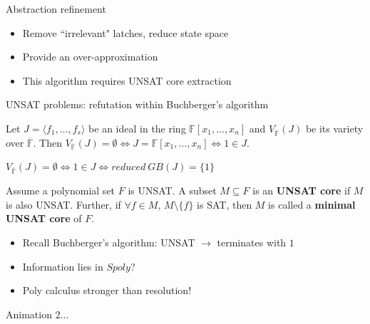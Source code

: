 \documentclass[xcolor=dvipsnames]{beamer}
\newcommand{\bi}{\begin{itemize}}
\newcommand{\ei}{\end{itemize}}
\newcommand{\F}{{\mathbb{F}}}
\begin{document}
\begin{frame}[label = refine]{\large{Abstraction refinement}}
\begin{figure}[hbt]
\end{figure}
\vspace{-0.2in}
\bi
\item Remove ``irrelevant" latches, reduce state space
\item Provide an over-approximation
\item This algorithm requires \alert{UNSAT core extraction}
\ei
\hyperlink{motiv3}{}
\end{frame}
\begin{frame}[label = UNSAT]{\large{UNSAT problems: refutation within Buchberger's algorithm}}
\begin{Theorem}
Let $J = \langle f_1,\dots, f_s \rangle $ be
an ideal in the ring $ \mathbb{F}[x_1, \dots, x_n]$ and $V_{\overline{\F}}(J)$ be its
variety over $\overline{\F}$. Then $V_{\overline{\F}}(J) = \emptyset \iff J =
\mathbb{F}[x_1,\dots,x_n] \iff 1 \in J$.  
\end{Theorem}
$V_{\overline{\F}}(J)=\emptyset \iff 1\in J \iff reduced~GB(J) = \{1\}$
\begin{Definition}
Assume a polynomial set $F$ is UNSAT. A subset $M \subseteq F$ is an {\bf UNSAT core} 
if $M$ is also UNSAT. Further, if $\forall f\in M$, $M\setminus\{f\}$ is SAT, then 
$M$ is called a {\bf minimal UNSAT core} of $F$.
\end{Definition}
\bi
\item Recall Buchberger's algorithm: UNSAT $\to$ terminates with $1$
\hyperlink{Buch}{}
\pause
\item  Information lies in $Spoly$?
\item Poly calculus stronger than resolution!
\ei



Animation 2...
\end{frame}
\end{document}
